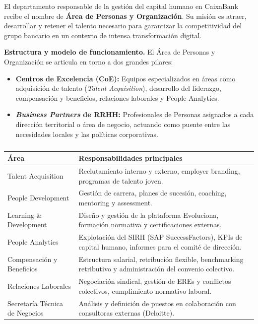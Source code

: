 \begin{bloquedemejora}
El departamento responsable de la gestión del capital humano en CaixaBank recibe
el nombre de \textbf{Área de Personas y Organización}. Su misión es atraer,
desarrollar y retener el talento necesario para garantizar la competitividad
del grupo bancario en un contexto de intensa transformación digital.

\medskip
\textbf{Estructura y modelo de funcionamiento.}
El Área de Personas y Organización se articula en torno a dos grandes pilares:
\begin{itemize}
  \item \textbf{Centros de Excelencia (CoE):} Equipos especializados en áreas
        como adquisición de talento (\textit{Talent Acquisition}), desarrollo
        del liderazgo, compensación y beneficios, relaciones laborales y
        People Analytics.
  \item \textbf{\textit{Business Partners} de RRHH:} Profesionales de Personas
        asignados a cada dirección territorial o área de negocio, actuando como
        puente entre las necesidades locales y las políticas corporativas.
\end{itemize}
\end{bloquedemejora}

\begin{table}[H]
  \centering
  \small
  \caption{}
  \begin{tabularx}{\textwidth}{p{} X}
    \toprule
    \textbf{Área}                       & \textbf{Responsabilidades principales} \\
    \midrule
    Talent Acquisition                  & Reclutamiento interno y externo, employer branding, programas de talento joven. \\
    People Development                  & Gestión de carrera, planes de sucesión, coaching, mentoring y assessment. \\
    Learning \& Development             & Diseño y gestión de la plataforma Evoluciona, formación normativa y certificaciones externas. \\
    People Analytics                    & Explotación del SIRH (SAP SuccessFactors), KPIs de capital humano, informes para el comité de dirección. \\
    Compensación y Beneficios           & Estructura salarial, retribución flexible, benchmarking retributivo y administración del convenio colectivo. \\
    Relaciones Laborales                & Negociación sindical, gestión de EREs y conflictos colectivos, cumplimiento normativo laboral. \\
    Secretaría Técnica de Negocios      & Análisis y definición de puestos en colaboración con consultoras externas (Deloitte). \\
    \bottomrule
  \end{tabularx}
\end{table}
